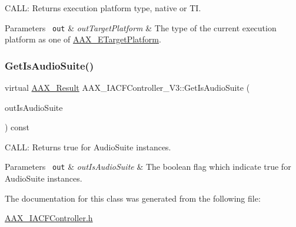 C\+A\+LL\+: Returns execution platform type, native or TI. 


\begin{DoxyParams}[1]{Parameters}
\mbox{\texttt{ out}}  & {\em out\+Target\+Platform} & The type of the current execution platform as one of \mbox{\hyperlink{a00491_a19e8cc27f59bb9bb4039b00fadb3cb83}{A\+A\+X\+\_\+\+E\+Target\+Platform}}. \\
\hline
\end{DoxyParams}
\mbox{\label{a01645_a2511f4ddb2d0fd17f6f17fe8a6980add}} 
\subsubsection{\texorpdfstring{GetIsAudioSuite()}{GetIsAudioSuite()}}
{\footnotesize\ttfamily virtual \mbox{\hyperlink{a00392_a4d8f69a697df7f70c3a8e9b8ee130d2f}{A\+A\+X\+\_\+\+Result}} A\+A\+X\+\_\+\+I\+A\+C\+F\+Controller\+\_\+\+V3\+::\+Get\+Is\+Audio\+Suite (\begin{DoxyParamCaption}\item[{\mbox{\hyperlink{a00392_aa216506530f1d19a2965931ced2b274b}{A\+A\+X\+\_\+\+C\+Boolean}} $\ast$}]{out\+Is\+Audio\+Suite }\end{DoxyParamCaption}) const\hspace{0.3cm}{\ttfamily [pure virtual]}}



C\+A\+LL\+: Returns true for Audio\+Suite instances. 


\begin{DoxyParams}[1]{Parameters}
\mbox{\texttt{ out}}  & {\em out\+Is\+Audio\+Suite} & The boolean flag which indicate true for Audio\+Suite instances. \\
\hline
\end{DoxyParams}


The documentation for this class was generated from the following file\+:\begin{DoxyCompactItemize}
\item 
\mbox{\hyperlink{a00515}{A\+A\+X\+\_\+\+I\+A\+C\+F\+Controller.\+h}}\end{DoxyCompactItemize}
